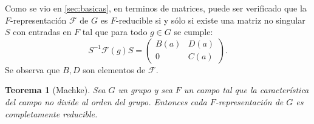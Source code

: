 \documentclass[12pt]{book}
\newtheorem{theorem}{Teorema}[section]
\theoremstyle{definition}
\newcounter{in}
\begin{document}
Como se vio en \ref{sec:basicas}, en terminos de matrices, puede ser verificado que la $F$-representación $\mathcal{F}$ de $G$ es $F$-reducible si y sólo si existe una matriz no singular $S$ con entradas en $F$ tal que para todo $g \in G$ se cumple:
\begin{equation*}
  S^{-1}\mathcal{F}(g)S=
  \begin{pmatrix}
    B\left(a\right) & D\left(a\right) \\
    0 & C\left(a\right)
  \end{pmatrix}. 
\end{equation*}  
Se observa que $B, D$ son elementos de $\mathcal{F}$.
\begin{theorem}[Machke]
  \label{tma}
  Sea $G$ un grupo y sea $F$ un campo tal que la característica del
  campo no divide al orden del grupo. Entonces cada $F$-representación
  de $G$ es completamente reducible.
\end{theorem}



\backmatter




\printindex
\end{document}
